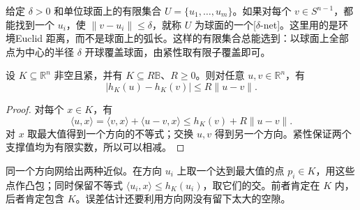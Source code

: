 \ProseParagraphBreak

给定 \(\delta>0\) 和单位球面上的有限集合 \(U=\{u_1,\ldots,u_m\}\)。如果对每个 \(v\in S^{n-1}\)，都能找到一个 \(u_i\)，使 \(\lVert v-u_i\rVert\le\delta\)，就称 \(U\) 为球面的一个[\(\delta\)-net]。这里用的是环境Euclid 距离，而不是球面上的弧长。这样的有限集合总能选到：以球面上全部点为中心的半径 \(\delta\) 开球覆盖球面，由紧性取有限子覆盖即可。

\begin{lemma}\label{g1:lem:support-lipschitz-bound}
	设 \(K\subseteq\mathbb R^n\) 非空且紧，并有 \(K\subseteq R\mathbb B\)、\(R\ge0\)。则对任意 \(u,v\in\mathbb R^n\)，有
	\begin{equation}\label{g1:eq:support-lipschitz-bound}
		|h_K(u)-h_K(v)|\le R\lVert u-v\rVert.
	\end{equation}
\end{lemma}
\begin{proof}
	对每个 \(x\in K\)，有
	\[
		\langle u,x\rangle
		=\langle v,x\rangle+\langle u-v,x\rangle
		\le h_K(v)+R\lVert u-v\rVert.
	\]
	对 \(x\) 取最大值得到一个方向的不等式；交换 \(u,v\) 得到另一个方向。紧性保证两个支撑值均为有限实数，所以可以相减。
\end{proof}

同一个方向网给出两种近似。在方向 \(u_i\) 上取一个达到最大值的点 \(p_i\in K\)，用这些点作凸包；同时保留不等式 \(\langle u_i,x\rangle\le h_K(u_i)\)，取它们的交。前者肯定在 \(K\) 内，后者肯定包含 \(K\)。误差估计还要利用方向网没有留下太大的空隙。

